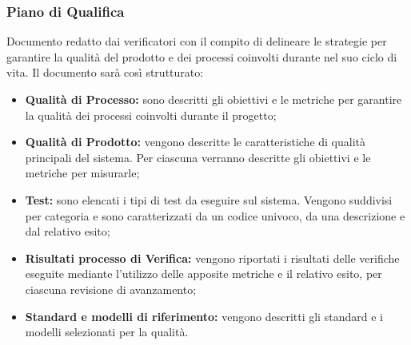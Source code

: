 \subsubsection{Piano di Qualifica}
Documento redatto dai verificatori con il compito di delineare le strategie per garantire la qualità del prodotto e dei processi coinvolti durante nel suo ciclo di vita. Il documento sarà così strutturato:
\begin{itemize}
  \item \textbf{Qualità di Processo:} sono descritti gli obiettivi e le metriche per garantire la qualità dei processi coinvolti durante il progetto;
  \item \textbf{Qualità di Prodotto:} vengono descritte le caratteristiche di qualità principali del sistema. Per ciascuna verranno descritte gli obiettivi e le metriche per misurarle;
  \item \textbf{Test:} sono elencati i tipi di test da eseguire sul sistema. Vengono suddivisi per categoria e sono caratterizzati da un codice univoco, da una descrizione e dal relativo esito;
  \item \textbf{Risultati processo di Verifica:} vengono riportati i risultati delle verifiche eseguite mediante l'utilizzo delle apposite metriche e il relativo esito, per ciascuna revisione di avanzamento;
  \item \textbf{Standard e modelli di riferimento:} vengono descritti gli standard e i modelli selezionati per la qualità.
\end{itemize}
